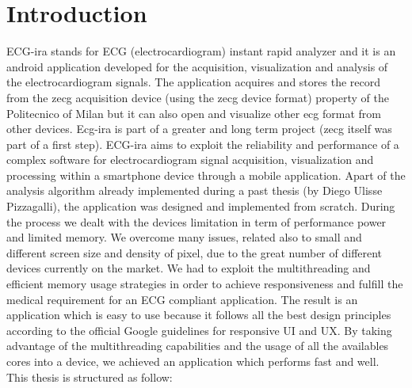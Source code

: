 
\chapter{Introduction}
\label{Chapter1} 

ECG-ira stands for ECG (electrocardiogram) instant rapid analyzer and it is an android application developed for the acquisition, visualization and analysis of the electrocardiogram signals. The application acquires and stores  the record from the zecg acquisition device  (using the zecg device format) property of the Politecnico of Milan but it can also open and visualize other ecg format from other  devices. Ecg-ira is part of a greater and long term project (zecg itself was part of a first step). ECG-ira aims to exploit the reliability and performance of a complex software for electrocardiogram signal acquisition,  visualization  and processing within a smartphone device through a mobile application. Apart of the analysis algorithm already implemented during a past thesis (by Diego Ulisse Pizzagalli), the application was designed and implemented from scratch. During the process we dealt with the devices limitation in term of performance power and limited memory. We overcome many issues, related also to small and different screen size and density of pixel, due to the great number of different devices currently on the market. We had to exploit the multithreading and efficient memory usage strategies in order to achieve responsiveness and fulfill the medical requirement for an ECG compliant application. The result is an application which is easy to use because it follows all the best design principles according to the official Google guidelines for responsive UI and UX. By taking advantage of the multithreading capabilities and the usage of all the availables cores into a device, we achieved an application which performs fast and well.\\
This thesis is structured as follow:
